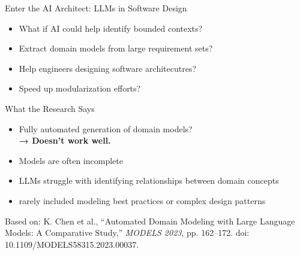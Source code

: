 \documentclass[aspectratio=169,12pt]{beamer}
\begin{document}
\begin{frame}{Enter the AI Architect: LLMs in Software Design}
\begin{itemize}
    \item What if AI could help identify bounded contexts?
    \item Extract domain models from large requirement sets?
    \item Help engineers designing software architecutres?
    \item Speed up modularization efforts?
\end{itemize}
\end{frame}

\begin{frame}{What the Research Says}
    \begin{itemize}
        \item Fully automated generation of domain models? \\
        \textbf{→ Doesn't work well.}
        
        \item Models are often incomplete
        \item LLMs struggle with identifying relationships between domain concepts
        \item rarely included modeling best practices or complex design patterns
    \end{itemize}
    \vspace{0.5cm}
    \tiny{
        Based on: K. Chen et al., “Automated Domain Modeling with Large Language Models: A Comparative Study,”
        \textit{MODELS 2023}, pp. 162–172. doi: 10.1109/MODELS58315.2023.00037.
    }
\end{frame}
\end{document}
